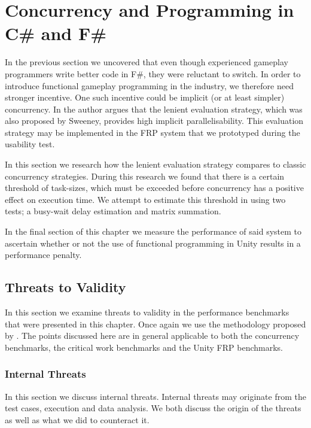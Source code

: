 \chapter{Concurrency and Programming in C\# and F\#}
In the previous section we uncovered that even though experienced gameplay programmers write better code in F\#, they were reluctant to switch. In order to introduce functional gameplay programming in the industry, we therefore need stronger incentive. One such incentive could be implicit (or at least simpler) concurrency. In \cite{DBLP:journals/cl/Tremblay-parallel} the author argues that the lenient evaluation strategy, which was also proposed by Sweeney, provides high implicit parallelisability. This evaluation strategy may be implemented in the \gls{FRP} system that we prototyped during the usability test.

In this section we research how the lenient evaluation strategy compares to classic concurrency strategies. During this research we found that there is a certain threshold of task-sizes, which must be exceeded before concurrency has a positive effect on execution time. We attempt to estimate this threshold in  using two tests; a busy-wait delay estimation and matrix summation.

In the final section of this chapter we measure the performance of said system to ascertain whether or not the use of functional programming in Unity results in a performance penalty. 





\section{Threats to Validity}
In this section we examine threats to validity in the performance benchmarks that were presented in this chapter. Once again we use the methodology proposed by \cite{mcleod:validity}. The points discussed here are in general applicable to both the concurrency benchmarks, the critical work benchmarks and the Unity \gls{FRP} benchmarks.

\subsection{Internal Threats}
In this section we discuss internal threats. Internal threats may originate from the test cases, execution and data analysis. We both discuss the origin of the threats as well as what we did to counteract it.

